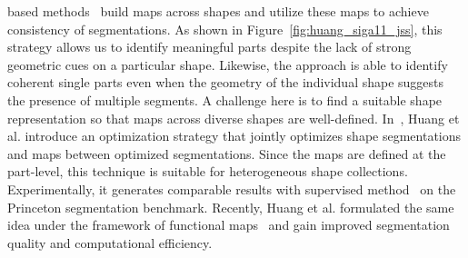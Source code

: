  based methods~\cite{Golovinskiy:2009:CS,Huang:2011:JSS,Wang:2013:FMap,Huang:2014:FMN} build maps across shapes and utilize these maps to achieve consistency of segmentations. As shown in Figure~\ref{fig:huang_siga11_jss}, this strategy allows us to identify meaningful parts despite the lack of strong geometric cues on a particular shape. Likewise, the approach is able to identify coherent single parts even when the geometry of the individual shape suggests the presence of multiple segments. A challenge here is to find a suitable shape representation so that maps across diverse shapes are well-defined. In~\cite{Huang:2011:JSS}, Huang et al. introduce an optimization strategy that jointly optimizes shape segmentations and maps between optimized segmentations. Since the maps are defined at the part-level, this technique is suitable for heterogeneous shape collections. Experimentally, it generates comparable results with supervised method~\cite{Kalogerakis:2010:LMS} on the Princeton segmentation benchmark.  Recently, Huang et al.\cite{Huang:2014:FMN} formulated the same idea under the framework of functional maps~\cite{Ovsjanikov:2012:FMF} and gain improved segmentation quality and computational efficiency.
